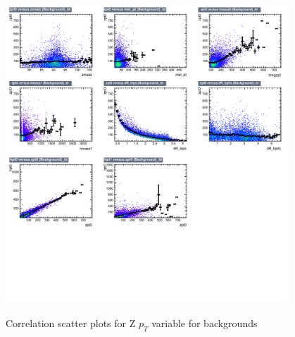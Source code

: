 \begin{figure}[!htb]%
\centering
\includegraphics[width=0.95\textwidth]{figures/CRDY/dataset/plots/correlationscatter_zpt0__Id_c3.pdf}
\includegraphics[width=0.95\textwidth]{figures/CRDY/dataset/plots/correlationscatter_zpt0__Id_c4.pdf}
\caption{ Correlation scatter plots for Z $p_{T}$ variable for backgrounds}%
\label{fig:correlations_CRDY_zpt_BG}                                                       
\end{figure}


